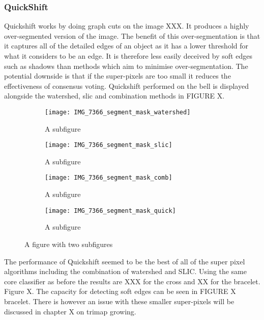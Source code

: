 \documentclass[12pt]{IIBproject}
\begin{document}
\subsubsection{QuickShift}
Quickshift works by doing graph cuts on the image XXX. It produces a highly over-segmented version of the image. The benefit of this over-segmentation is that it captures all of the detailed edges of an object as it has a lower threshold for what it considers to be an edge. It is therefore less easily deceived by soft edges such as shadows than methods which aim to minimise over-segmentation. The potential downside is that if the super-pixels are too small it reduces the effectiveness of consensus voting. Quickshift performed on the bell is displayed alongside the watershed, slic and combination methods in FIGURE X.
\begin{figure}[H]
\centering
\begin{subfigure}{.45\textwidth}
  \centering
  \texttt{[image: IMG\_7366\_segment\_mask\_watershed]}
  \caption{A subfigure}
  \label{fig:sub1}
\end{subfigure}%
\begin{subfigure}{.45\textwidth}
  \centering
  \texttt{[image: IMG\_7366\_segment\_mask\_slic]}
  \caption{A subfigure}
  \label{fig:sub2}
\end{subfigure}
\begin{subfigure}{.45\textwidth}
  \centering
  \texttt{[image: IMG\_7366\_segment\_mask\_comb]}
  \caption{A subfigure}
  \label{fig:sub2}
\end{subfigure}
\begin{subfigure}{.45\textwidth}
  \centering
  \texttt{[image: IMG\_7366\_segment\_mask\_quick]}
  \caption{A subfigure}
  \label{fig:sub2}
\end{subfigure}
\caption{A figure with two subfigures}
\label{fig:test}
\end{figure}



The performance of Quickshift seemed to be the best of all of the super pixel algorithms including the combination of watershed and SLIC. Using the same core classifier as before the results are XXX for the cross and XX for the bracelet. Figure X. The capacity for detecting soft edges can be seen in FIGURE X bracelet. There is however an issue with these smaller super-pixels will be discussed in chapter X on trimap growing.
\end{document}
